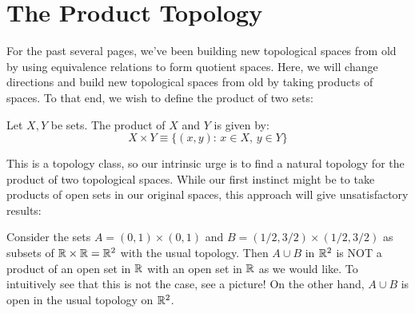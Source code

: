 

\section{The Product Topology}

For the past several pages, we've been building new topological spaces from old by using equivalence relations to form quotient spaces. Here, we will change directions and build new topological spaces from old by taking products of spaces. To that end, we wish to define the product of two sets: 
\begin{definition}
	Let $X,Y$ be sets. The product of $X$ and $Y$ is given by:
	\[X\times Y \equiv \{(x,y):\,x\in X,\,y\in Y\}\]
\end{definition}
This is a topology class, so our intrinsic urge is to find a natural topology for the product of two topological spaces. While our first instinct might be to take products of open sets in our original spaces, this approach will give unsatisfactory results: 
\begin{example}
	Consider the sets $A = (0,1)\times (0,1)$ and $B = (1/2,3/2)\times(1/2,3/2)$ as subsets of $\mathbb R\times\mathbb R = \mathbb R^2$ with the usual topology. Then $A\cup B$ in $\mathbb R^2$ is NOT a product of an open set in $\mathbb R$ with an open set in $\mathbb R$ as we would like. To intuitively see that this is not the case, see a picture! On the other hand, $A\cup B$ is open in the usual topology on $\mathbb R^2$. 
\end{example}

\placeholder

